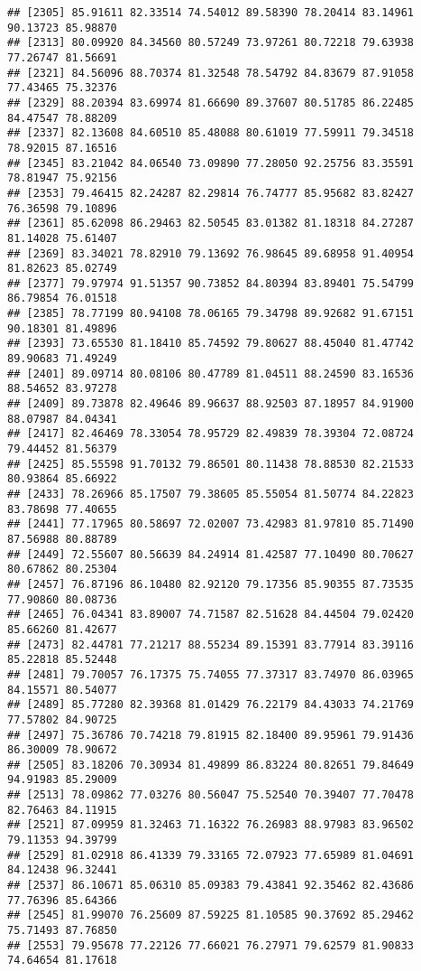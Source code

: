 \documentclass[
]{article}
\begin{document}
\begin{verbatim}
## [2305] 85.91611 82.33514 74.54012 89.58390 78.20414 83.14961 90.13723 85.98870
## [2313] 80.09920 84.34560 80.57249 73.97261 80.72218 79.63938 77.26747 81.56691
## [2321] 84.56096 88.70374 81.32548 78.54792 84.83679 87.91058 77.43465 75.32376
## [2329] 88.20394 83.69974 81.66690 89.37607 80.51785 86.22485 84.47547 78.88209
## [2337] 82.13608 84.60510 85.48088 80.61019 77.59911 79.34518 78.92015 87.16516
## [2345] 83.21042 84.06540 73.09890 77.28050 92.25756 83.35591 78.81947 75.92156
## [2353] 79.46415 82.24287 82.29814 76.74777 85.95682 83.82427 76.36598 79.10896
## [2361] 85.62098 86.29463 82.50545 83.01382 81.18318 84.27287 81.14028 75.61407
## [2369] 83.34021 78.82910 79.13692 76.98645 89.68958 91.40954 81.82623 85.02749
## [2377] 79.97974 91.51357 90.73852 84.80394 83.89401 75.54799 86.79854 76.01518
## [2385] 78.77199 80.94108 78.06165 79.34798 89.92682 91.67151 90.18301 81.49896
## [2393] 73.65530 81.18410 85.74592 79.80627 88.45040 81.47742 89.90683 71.49249
## [2401] 89.09714 80.08106 80.47789 81.04511 88.24590 83.16536 88.54652 83.97278
## [2409] 89.73878 82.49646 89.96637 88.92503 87.18957 84.91900 88.07987 84.04341
## [2417] 82.46469 78.33054 78.95729 82.49839 78.39304 72.08724 79.44452 81.56379
## [2425] 85.55598 91.70132 79.86501 80.11438 78.88530 82.21533 80.93864 85.66922
## [2433] 78.26966 85.17507 79.38605 85.55054 81.50774 84.22823 83.78698 77.40655
## [2441] 77.17965 80.58697 72.02007 73.42983 81.97810 85.71490 87.56988 80.88789
## [2449] 72.55607 80.56639 84.24914 81.42587 77.10490 80.70627 80.67862 80.25304
## [2457] 76.87196 86.10480 82.92120 79.17356 85.90355 87.73535 77.90860 80.08736
## [2465] 76.04341 83.89007 74.71587 82.51628 84.44504 79.02420 85.66260 81.42677
## [2473] 82.44781 77.21217 88.55234 89.15391 83.77914 83.39116 85.22818 85.52448
## [2481] 79.70057 76.17375 75.74055 77.37317 83.74970 86.03965 84.15571 80.54077
## [2489] 85.77280 82.39368 81.01429 76.22179 84.43033 74.21769 77.57802 84.90725
## [2497] 75.36786 70.74218 79.81915 82.18400 89.95961 79.91436 86.30009 78.90672
## [2505] 83.18206 70.30934 81.49899 86.83224 80.82651 79.84649 94.91983 85.29009
## [2513] 78.09862 77.03276 80.56047 75.52540 70.39407 77.70478 82.76463 84.11915
## [2521] 87.09959 81.32463 71.16322 76.26983 88.97983 83.96502 79.11353 94.39799
## [2529] 81.02918 86.41339 79.33165 72.07923 77.65989 81.04691 84.12438 96.32441
## [2537] 86.10671 85.06310 85.09383 79.43841 92.35462 82.43686 77.76396 85.64366
## [2545] 81.99070 76.25609 87.59225 81.10585 90.37692 85.29462 75.71493 87.76850
## [2553] 79.95678 77.22126 77.66021 76.27971 79.62579 81.90833 74.64654 81.17618

\end{verbatim}
\end{document}
